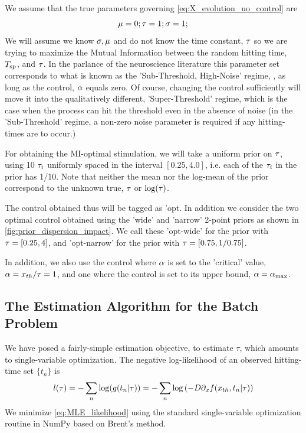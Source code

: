 We assume that the true parameters governing \cref{eq:X_evolution_uo_control} are
$$ {\mu } = 0; { \tau } = 1; \sigma = 1;
$$ We will assume we know $\sigma, {\mu }$ and do not know the time constant, ${ \tau }$ so
we are trying to maximize the Mutual Information between the random hitting
time, ${ T_{\textrm{sp} } }$, and ${ \tau }$. In the parlance of the neuroscience literature this
parameter set corresponds to what is known as the 'Sub-Threshold, High-Noise'
regime, \cite{Iolov2013}, as long as the control, $\alpha$ equals zero. Of course,
changing the control sufficiently will move it into the qualitatively different,
'Super-Threshold' regime, which is the case when the process can hit the
threshold even in the absence of noise (in the 'Sub-Threshold' regime, a
non-zero noise parameter is required if any hitting-times are to occur.)

For obtaining the MI-optimal stimulation, we will take a uniform prior on
${ \tau }$, using 10 ${ \tau }_i$ uniformly spaced in the interval $[0.25, 4.0]$, i.e.
each of the ${ \tau }_i$ in the prior has 1/10. Note that neither the mean nor the
log-mean of the prior correspond to the unknown true, ${ \tau }$ or $\log({ \tau })$.
 
The control obtained thus will be tagged as 'opt. In addition we consider the
two optimal control obtained using the 'wide' and 'narrow' 2-point priors as
shown in \cref{fig:prior_dispersion_impact}. We call these 'opt-wide' for the
prior with ${ \tau } =  [0.25, 4]$, and 'opt-narrow' for the prior with  ${ \tau } =  
[0.75, 1/0.75]$.  

In addition, we also use the control where $\alpha$ is set to the 'critical' value,
$\alpha = { x_{th} }/{ \tau } = 1$, and one where the control is set to its upper
bound, $\alpha = { \alpha_{\textrm{max}} }$.

\subsection{The Estimation Algorithm for the Batch Problem}
We have posed a fairly-simple estimation objective, to estimate $\tau$, which
amounts to single-variable optimization. The negative log-likelihood of an
observed hitting-time set $\{t_n\}$ is
\begin{equation}
l({ \tau }) = - \sum_n \log ( g(t_n | { \tau }) ) =  - \sum_n \log \left( -D {\partial}_x f({ x_{th} },
t_n |{ \tau }) \right)
\label{eq:MLE_likelihood}
\end{equation}
We minimize \cref{eq:MLE_likelihood} using the standard single-variable
optimization routine in NumPy based on Brent's method.

